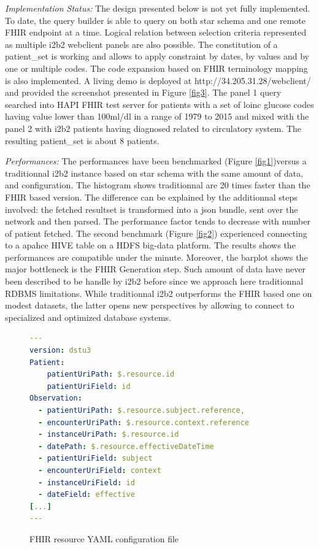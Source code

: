 \documentclass{amia}
\begin{document}
\textit{Implementation Status: } The design presented below is not yet fully implemented. To date, the query builder is able to query on both star schema and one remote FHIR endpoint at a time. Logical relation between selection criteria represented as multiple i2b2 webclient panels are also possible. The constitution of a patient\_set is working and allows to apply constraint by dates, by values and by one or multiple codes. The code expansion based on FHIR terminology mapping is also implemented. A living demo is deployed at http://34.205.31.28/webclient/ and provided the screenshot presented in Figure \ref{fig3}. The panel 1 query searched into HAPI FHIR test server for patients with a set of loinc glucose codes having value lower than 100ml/dl in a range of 1979 to 2015 and mixed with the panel 2 with i2b2 patients having diagnosed related to circulatory system. The resulting patient\_set is about 8 patients.

\textit{Performances: } The performances have been benchmarked (Figure \ref{fig1})versus a traditionnal i2b2 instance based on star schema with the same amount of data, and configuration. The histogram shows traditionnal are 20 times faster than the FHIR based version. The difference can be explained by the additionnal steps involved: the fetched resultset is transformed into a json bundle, sent over the network and then parsed. The performance factor tends to decrease with number of patient fetched. The second benchmark (Figure \ref{fig2}) experienced connecting to a apahce HIVE table on a HDFS big-data platform. The results shows the performances are compatible under the minute. Moreover, the barplot shows the major bottleneck is the FHIR Generation step. Such amount of data have never been described to be handle by i2b2 before since we approach here traditionnal RDBMS limitations. While traditionnal i2b2 outperforms the FHIR based one on modest datasets, the latter opens new perspectives by allowing to connect to specialized and optimized database systems.

\begin{figure}
\begin{lstlisting}[language=yaml]
---
version: dstu3
Patient:
    patientUriPath: $.resource.id
    patientUriField: id
Observation:
  - patientUriPath: $.resource.subject.reference,
  - encounterUriPath: $.resource.context.reference
  - instanceUriPath: $.resource.id
  - datePath: $.resource.effectiveDateTime
  - patientUriField: subject
  - encounterUriField: context
  - instanceUriField: id
  - dateField: effective
[...]
---
\end{lstlisting}
  \caption{FHIR resource YAML configuration file}
	\label{conf1}
\end{figure}
\end{document}
